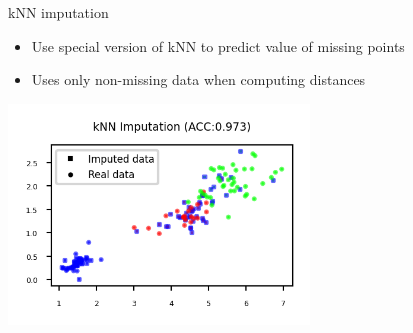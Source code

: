 \begin{frame}{kNN imputation}

\begin{itemize}
    \item Use special version of kNN to predict value of missing points
    \item Uses only non-missing data when computing distances
\end{itemize}

\vspace{1em}

\begin{center}
    \includegraphics[width=0.6\textwidth]{images/pre-processing/knn-imputation.png}
\end{center}

\end{frame}



